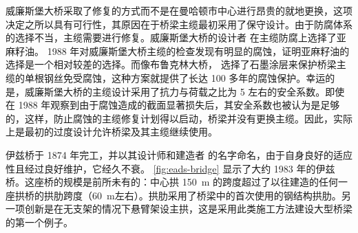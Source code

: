 威廉斯堡大桥采取了修复的方式而不是在曼哈顿市中心进行昂贵的就地更换，这项决定之所以具有可行性，其原因在于桥梁主缆最初采用了保守设计。由于防腐体系的选择不当，主缆需要进行修复。威廉斯堡大桥的设计者  在主缆防腐上选择了亚麻籽油。 1988 年对威廉斯堡大桥主缆的检查发现有明显的腐蚀，证明亚麻籽油的选择是一个相对较差的选择。而像布鲁克林大桥， 选择了石墨涂层来保护桥梁主缆的单根钢丝免受腐蚀，这种方案就提供了长达 100 多年的腐蚀保护。幸运的是，威廉斯堡大桥的主缆设计采用了抗力与荷载之比为 5 左右的安全系数。即使在 1988 年观察到由于腐蚀造成的截面显著损失后，其安全系数也被认为是足够的，这样，防止腐蚀的主缆修复计划得以启动，桥梁并没有更换主缆。因此，实际上是最初的过度设计允许桥梁及其主缆继续使用。


伊兹桥于 1874 年完工，并以其设计师和建造者  的名字命名，由于自身良好的适应性且经过良好维护，它经久不衰。 \cref{fig:eads-bridge} 显示了大约 1983 年的伊兹桥。这座桥的规模是前所未有的：中心拱 \qty{150}{m} 的跨度超过了以往建造的任何一座拱桥的拱肋跨度（\qty{60}{m}左右）。拱肋采用了桥梁中的首次使用的钢结构拱肋。另一项创新是在无支架的情况下悬臂架设主拱，这是采用此类施工方法建设大型桥梁的第一个例子。

